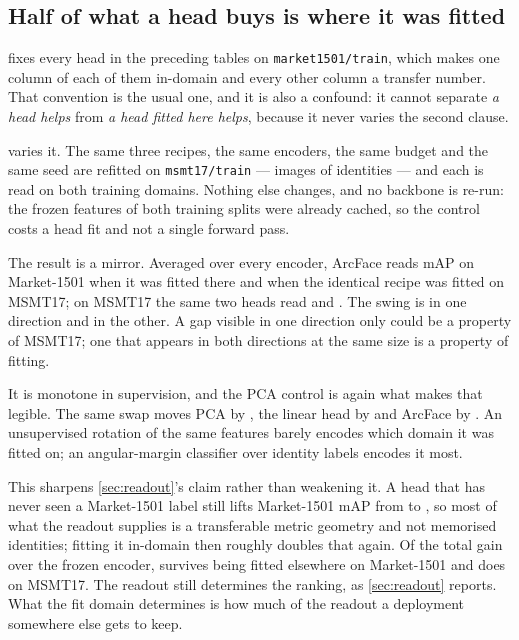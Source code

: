 \subsection{Half of what a head buys is where it was fitted}
 fixes every head in the preceding tables on \texttt{market1501/train}, which
makes one column of each of them in-domain and every other column a transfer number. That
convention is the usual one, and it is also a confound: it cannot separate \emph{a head helps}
from \emph{a head fitted here helps}, because it never varies the second clause.

 varies it. The same three recipes, the same encoders, the same budget and
the same seed are refitted on \texttt{msmt17/train} --- \nHeadImagesMsmt{} images of
\nHeadIdentitiesMsmt{} identities --- and each is read on both training domains. Nothing else
changes, and no backbone is re-run: the frozen features of both training splits were already
cached, so the control costs a head fit and not a single forward pass.

The result is a mirror. Averaged over every encoder, ArcFace reads \fitArcfaceMarketHere{} mAP
on Market-1501 when it was fitted there and \fitArcfaceMarketElse{} when the identical recipe
was fitted on MSMT17; on MSMT17 the same two heads read \fitArcfaceMsmtHere{} and
\fitArcfaceMsmtElse{}. The swing is \fitSwingArcfaceMarket{} in one direction and
\fitSwingArcfaceMsmt{} in the other. A gap visible in one direction only could be a property of
MSMT17; one that appears in both directions at the same size is a property of fitting.

It is monotone in supervision, and the PCA control is again what makes that legible. The same
swap moves PCA by \fitSwingPcaMarket{}, the linear head by \fitSwingLinearMarket{} and ArcFace
by \fitSwingArcfaceMarket{}. An unsupervised rotation of the same features barely encodes which
domain it was fitted on; an angular-margin classifier over identity labels encodes it most.

This sharpens \cref{sec:readout}'s claim rather than weakening it. A head that has never seen a
Market-1501 label still lifts Market-1501 mAP from \fitFrozenMarket{} to
\fitArcfaceMarketElse{}, so most of what the readout supplies is a transferable metric geometry
and not memorised identities; fitting it in-domain then roughly doubles that again. Of the
total gain over the frozen encoder, \fitShareArcfaceMarket{} survives being fitted elsewhere on
Market-1501 and \fitShareArcfaceMsmt{} does on MSMT17. The readout still determines the
ranking, as \cref{sec:readout} reports. What the fit domain determines is how much of the
readout a deployment somewhere else gets to keep.


